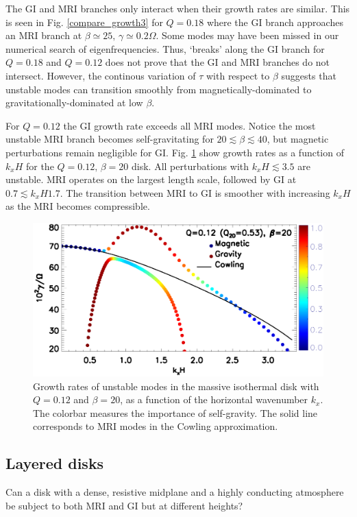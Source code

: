 The GI and MRI branches only interact when their growth rates
are similar. This is seen in Fig. \ref{compare_growth3} for $Q=0.18$
where the GI branch approaches an MRI branch at $\beta\simeq 25,\,
\gamma\simeq 0.2\Omega$. 
Some modes may have been missed in our
numerical search of eigenfrequencies. Thus, `breaks' along the
GI branch for $Q=0.18$ and $Q=0.12$ does not prove that the GI and MRI branches do not
intersect. However, the continous variation of $\tau$ with respect to
$\beta$ suggests that unstable modes can transition smoothly from
magnetically-dominated to gravitationally-dominated at low $\beta$.  

For $Q=0.12$ the GI growth rate exceeds all MRI modes. Notice the most
unstable MRI branch becomes self-gravitating for $20 \lesssim
\beta\lesssim 40$, but magnetic perturbations remain negligible
for GI. 
Fig. \ref{compare_growth3_Q01d2} show growth rates
as a function of $k_xH$ for the $Q=0.12,\,\beta=20$ disk. All
perturbations with $k_xH \lesssim 3.5$ are unstable. MRI operates on the largest
length scale, followed by GI at $0.7 \lesssim k_xH 1.7$. The 
transition between MRI to GI is smoother with increasing $k_xH$ as the
MRI becomes compressible. 


\begin{figure}
  \includegraphics[width=\linewidth]{figures/compare_growth3_Q0d12_B20.ps}  
  \caption{Growth rates of unstable modes in the massive isothermal
    disk with $Q=0.12$ and $\beta=20$, as a function of the horizontal
    wavenumber $k_x$. The colorbar measures the importance of
    self-gravity. The solid line corresponds to MRI modes in the
    Cowling approximation. 
    \label{compare_growth3_Q01d2}}
\end{figure}


\subsection{Layered disks}
Can a disk with a dense, resistive midplane and a highly conducting
atmosphere  be subject to both MRI and GI but at different heights?  



